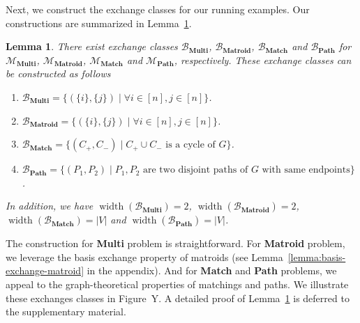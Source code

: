 \documentclass{article}
\newtheorem{lemma}{Lemma}
\newcommand{\M}{\mathcal M}
\newcommand{\B}{\mathcal B}
\DeclareMathOperator{\rank}{width}
\newcommand{\MultiIdent}{\textbf{Multi}\xspace}
\newcommand{\Matroid}{\textbf{Matroid}\xspace}
\newcommand{\Match}{\textbf{Match}\xspace}
\newcommand{\Path}{\textbf{Path}\xspace}
\begin{document}
\begin{spacing}{1.1}
Next, we construct the exchange classes for our running examples. 
Our constructions are summarized in Lemma~\ref{lemma:example-exchange-class}.
\begin{lemma}
There exist exchange classes $\B_{\MultiIdent}$, $\B_{\Matroid}$, $\B_{\Match}$ and $\B_{\Path}$ for $\M_{\MultiIdent}$, $\M_{\Matroid}$, $\M_{\Match}$ and $\M_{\Path}$, respectively. 
These exchange classes can be constructed as follows
\begin{enumerate}
	\item $\B_{\MultiIdent}=\big\{(\{i\},\{j\})\;|\;\forall i\in [n], j\in [n]\big\}$.
	\item $\B_{\Matroid}=\big\{(\{i\},\{j\})\;|\;\forall i\in [n], j\in [n]\big\}$.
	\item $\B_{\Match}=\big\{(C_+,C_-)\;|\; C_+\cup C_- \text{ is a cycle of }G\big\}$.
	\item $\B_{\Path}=\big\{ (P_1, P_2) \;|\;P_1,P_2\text{ are two disjoint paths of }G\text{ with same endpoints}\big\}$.
\end{enumerate}
In addition, we have $\rank(\B_{\MultiIdent})=2$, $\rank(\B_{\Matroid})=2$, $\rank(\B_{\Match})=|V|$ and $\rank(\B_{\Path})=|V|$.
\label{lemma:example-exchange-class}
\end{lemma}
The  construction for \MultiIdent problem is straightforward. 
For \Matroid problem, we leverage the basis exchange property of matroids (see Lemma~\ref{lemma:basis-exchange-matroid} in the appendix).
And for \Match and \Path problems, we appeal to the graph-theoretical properties of matchings and paths.
We illustrate these  exchanges classes in Figure~Y.
A detailed proof of Lemma~\ref{lemma:example-exchange-class} is deferred to the supplementary material.



\end{spacing}
\end{document}
